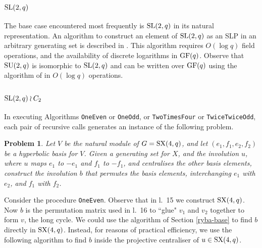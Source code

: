 \documentclass[12pt]{article}
\newtheorem{problem}[definition]{Problem}
\def\SL{{\rm SL}}
\def\GF{{\rm GF}}
\def\SU{{\rm SU}}
\def\SX{{\rm SX}}
\begin{document}
\subsection{$\SL(2,q)$}
The base case encountered most frequently is $\SL(2,q)$
in its natural representation.
An algorithm to construct an element of $\SL(2,q)$ as an SLP  
in an arbitrary generating set is described in \cite{Conderetal05}. 
This algorithm requires $O(\log q)$ field operations, and the 
availability of discrete logarithms in $\GF(q)$.
Observe that $\SU(2, q)$ is isomorphic to $\SL(2, q)$
and can be written over $\GF(q)$ using the algorithm 
of \cite{GLO} in $O(\log q)$ operations.


\subsection{$\SL(2, q) \wr C_2$}\label{glue-element}
In executing Algorithms {\tt OneEven} or {\tt OneOdd}, or
{\tt TwoTimesFour} or {\tt TwiceTwiceOdd}, 
each pair of recursive calls generates
an instance of the following problem.

\begin{problem} \label{glue}
Let $V$ be the natural module of  $G=\SX(4,q)$, and let
$(e_1,f_1,e_2,f_2)$ be a hyperbolic basis for $V$. Given a generating
set for $X$, and the involution $u$, where $u$ maps $e_1$ to $-e_1$
and $f_1$ to $-f_1$, and centralises the other basis
elements, construct the involution  $b$  that permutes the basis
elements, interchanging $e_1$ with $e_2$, and $f_1$ with $f_2$.
\end{problem}

Consider the procedure {\tt OneEven}.
Observe that in l.\ 15 we construct $\SX(4, q)$.
Now $b$ is the permutation matrix used in l.\ 16 to 
``glue" $v_1$ and $v_2$ together to form $v$, the long cycle. 
We could use the algorithm of Section \ref{ryba-base}  to find
$b$ directly in $\SX(4, q)$.
Instead, for reasons of practical efficiency, we 
use the following algorithm to 
find $b$ inside the projective centraliser of $u \in \SX(4, q)$. 
\end{document}
